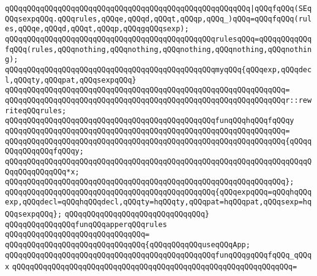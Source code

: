\verb|qQQqqQQqqQQqqQQqqQQqqQQqqQQqqQQqqQQqqQQqqQQqqQQqqQQqqQQq|\verb#|qQQqfqQQq(SEqQQqsexpqQQq.qQQqrules,qQQqe,qQQqd,qQQqt,qQQqp,qQQq_)qQQq=qQQqfqQQq(rules,qQQqe,qQQqd,qQQqt,qQQqp,qQQqgqQQqsexp);#\newline
\newline
\verb|qQQqqQQqqQQqqQQqqQQqqQQqqQQqqQQqqQQqqQQqqQQqqQQqrulesqQQq=qQQqqQQqqQQqfqQQq(rules,qQQqnothing,qQQqnothing,qQQqnothing,qQQqnothing,qQQqnothing);|\newline
\newline
\verb|qQQqqQQqqQQqqQQqqQQqqQQqqQQqqQQqqQQqqQQqqQQqqQQqmyqQQq{qQQqexp,qQQqdecl,qQQqty,qQQqpat,qQQqsexpqQQq}|\newline
\verb|qQQqqQQqqQQqqQQqqQQqqQQqqQQqqQQqqQQqqQQqqQQqqQQqqQQqqQQqqQQqqQQq=|\newline
\verb|qQQqqQQqqQQqqQQqqQQqqQQqqQQqqQQqqQQqqQQqqQQqqQQqqQQqqQQqqQQqqQQqr::rewriteqQQqrules;|\newline
\newline
\verb|qQQqqQQqqQQqqQQqqQQqqQQqqQQqqQQqqQQqqQQqqQQqqQQqfunqQQqhqQQqfqQQqy|\newline
\verb|qQQqqQQqqQQqqQQqqQQqqQQqqQQqqQQqqQQqqQQqqQQqqQQqqQQqqQQqqQQqqQQq=|\newline
\verb|qQQqqQQqqQQqqQQqqQQqqQQqqQQqqQQqqQQqqQQqqQQqqQQqqQQqqQQqqQQqqQQq{qQQqqQQqqQQqqQQqfqQQqy;|\newline
\verb|qQQqqQQqqQQqqQQqqQQqqQQqqQQqqQQqqQQqqQQqqQQqqQQqqQQqqQQqqQQqqQQqqQQqqQQqqQQqqQQqqQQq*x;|\newline
\verb|qQQqqQQqqQQqqQQqqQQqqQQqqQQqqQQqqQQqqQQqqQQqqQQqqQQqqQQqqQQqqQQq};|\newline
\newline
\verb|qQQqqQQqqQQqqQQqqQQqqQQqqQQqqQQqqQQqqQQqqQQqqQQq{qQQqexpqQQq=qQQqhqQQqexp,qQQqdecl=qQQqhqQQqdecl,qQQqty=hqQQqty,qQQqpat=hqQQqpat,qQQqsexp=hqQQqsexpqQQq};|\newline
\verb|qQQqqQQqqQQqqQQqqQQqqQQqqQQqqQQq}|\newline
\newline
\verb|qQQqqQQqqQQqqQQqfunqQQqapperqQQqrules|\newline
\verb|qQQqqQQqqQQqqQQqqQQqqQQqqQQqqQQq=|\newline
\verb|qQQqqQQqqQQqqQQqqQQqqQQqqQQqqQQq{qQQqqQQqqQQquseqQQqApp;|\newline
\newline
\verb|qQQqqQQqqQQqqQQqqQQqqQQqqQQqqQQqqQQqqQQqqQQqqQQqfunqQQqgqQQqfqQQq_qQQqx|\newline
\verb|qQQqqQQqqQQqqQQqqQQqqQQqqQQqqQQqqQQqqQQqqQQqqQQqqQQqqQQqqQQqqQQq=|\newline
